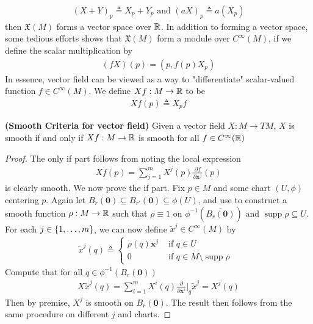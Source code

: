 \documentclass{report}
\begin{document}
\begin{mdframed}
\begin{align*}
   (X+Y)_p\triangleq X_p+Y_p \text{ and } (aX)_p\triangleq a(X_p)
\end{align*}
then $\mathfrak{X}(M)$ forms a vector space over $\mathbb{R}$. In addition to forming a vector space, some tedious efforts shows that $\mathfrak{X}(M)$ form a module over $C^{\infty}(M)$, if we define the scalar multiplication by 
\begin{align*}
  (fX)(p)=(p,f(p)X_p)
\end{align*}
In essence, vector field can be viewed as a way to "differentiate" scalar-valued function $f\in C^{\infty}(M)$. We define $Xf:M\rightarrow \mathbb{R}$ to be 
\begin{align*}
Xf(p)\triangleq X_pf
\end{align*}
\end{mdframed}
\begin{theorem}
\label{SCfv}
\textbf{(Smooth Criteria for vector field)} Given a vector field $X:M\rightarrow TM$, $X$ is smooth if and only if  $Xf:M\rightarrow \mathbb{R}$ is smooth for all $f\in C^{\infty}(\mathbb{R})$
\end{theorem}
\begin{proof}
The only if part follows from noting the local expression  
 \begin{align*}
Xf(p)=\sum_{j=1}^m X^j (p) \frac{\partial f}{\partial \textbf{x}^j}(p)
\end{align*}
is clearly smooth. We now prove the if part. Fix $p\in  M$ and some chart $(U,\phi)$ centering $p$. Again let $\overline{B_r(\textbf{0})}\subseteq B_{r'}(\textbf{0})\subseteq \phi (U)$, and use  to construct a smooth function $\rho : M\rightarrow \mathbb{R}$ such that $\rho\equiv 1$ on $\phi ^{-1}(\overline{B_r(\textbf{0})})$  and $\operatorname{supp}\rho \subseteq U$. For each $j\in \{ 1,\dots,m \}$, we can now define $\tilde{x}^j\in C^{\infty}(M)$ by 
\begin{align*}
\tilde{x}^j(q)\triangleq \begin{cases}
  \rho (q)\textbf{x}^j & \text{ if $q \in U$ }\\
  0& \text{ if $q\in M \setminus \operatorname{supp}\rho $ }
\end{cases} 
\end{align*}
Compute that for all $q\in \phi^{-1}(B_r(\textbf{0}))$
\begin{align*}
X\tilde{x}^j(q)= \sum_{i=1}^m X^i(q) \frac{\partial }{\partial \textbf{x}^i}\Big|_q \tilde{x}^j = X^j(q)
\end{align*}
Then by premise, $X^j$ is smooth on  $B_r(\textbf{0})$. The result then follows from the same procedure on different $j$ and charts. 
\end{proof}
\end{document}
